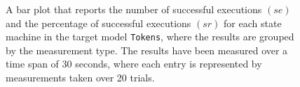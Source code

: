 \begin{figure}[h!]
\centering
\begin{minipage}{1\textwidth}
  \centering
  \makebox[\textwidth][c]{ %
        \resizebox{1.19\textwidth}{!}{ %
            
        }%
    }%
\end{minipage}
\caption{A bar plot that reports the number of successful executions $(se)$ and the percentage of successful executions $(sr)$ for each state machine in the target model \texttt{Tokens}, where the results are grouped by the measurement type. The results have been measured over a time span of 30 seconds, where each entry is represented by measurements taken over 20 trials.}
\label{figure:counting_logging_state_machine_transition_frequency_comparison_tokens}
\end{figure}